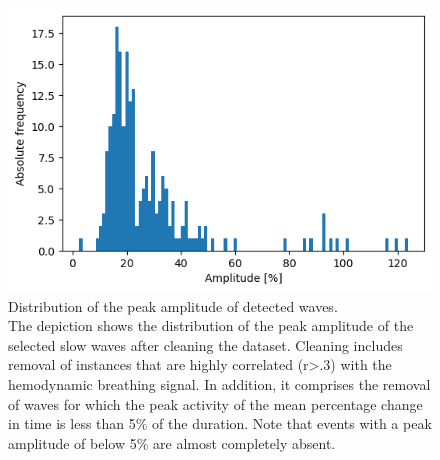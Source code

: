 \begin{figure}[!htb]
\centering
\includegraphics[width=\textwidth,height=\textheight,keepaspectratio]{Figures/selected_waves_distribution_of_peak_amplitude}
\decoRule
\caption[Distribution of the peak amplitude of detected waves]{Distribution of the peak amplitude of detected waves.\\The depiction shows the distribution of the peak amplitude of the selected slow waves after cleaning the dataset. Cleaning includes removal of instances that are highly correlated (r>.3) with the hemodynamic breathing signal. In addition, it comprises the removal of waves for which the peak activity of the mean percentage change in time is less than 5\% of the duration. Note that events with a peak amplitude of below 5\% are almost completely absent.}
\label{fig:selected_waves_distribution_of_peak_amplitude}
\end{figure}

